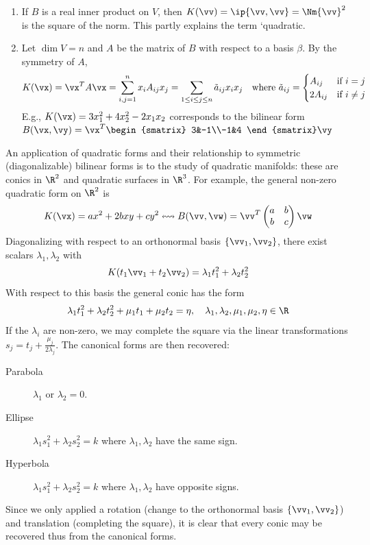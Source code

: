 \begin{examples}{}{}
\begin{enumerate}
  \item If $B$ is a real inner product on $V$, then $K(\vv)=\ip{\vv,\vv}=\Nm{\vv}^2$ is the square of the norm. This partly explains the term `quadratic.
  
  \item Let $\dim V=n$ and $A$ be the matrix of $B$ with respect to a basis $\beta$. By the symmetry of $A$,
  \[K(\vx)=\vx^TA\vx=\sum_{i,j=1}^nx_iA_{ij}x_j =\sum_{1\le i\le j\le n}\tilde a_{ij}x_ix_j
  \quad\text{where}\ \tilde a_{ij}=\begin{cases}
  A_{ij}&\text{if $i=j$}\\
  2A_{ij}&\text{if }i\neq j
  \end{cases}\]
  E.g., $K(\vx)=3x_1^2+4x_2^2-2x_1x_2$ corresponds to the bilinear form $B(\vx,\vy)=\vx^T\begin{smatrix}
  3&-1\\-1&4
  \end{smatrix}\vy$
\end{enumerate}
\end{examples}

An application of quadratic forms and their relationship to symmetric (diagonalizable) bilinear forms is to the study of quadratic manifolds: these are conics in $\R^2$ and quadratic surfaces in $\R^3$. For example, the general non-zero quadratic form on $\R^2$ is
\[K(\vx)=ax^2+2bxy+cy^2\leftrightsquigarrow B(\vv,\vw)=\vv^T\begin{pmatrix}
a&b\\b&c
\end{pmatrix}\vw\]
Diagonalizing with respect to an orthonormal basis $\{\vv_1,\vv_2\}$, there exist scalars $\lambda_1,\lambda_2$ with
\[K(t_1\vv_1+t_2\vv_2)=\lambda_1t_1^2+\lambda_2t_2^2\]
With respect to this basis the general conic has the form
\[\lambda_1t_1^2+\lambda_2t_2^2+\mu_1t_1+\mu_2t_2=\eta,\quad \lambda_1,\lambda_2,\mu_1,\mu_2,\eta\in\R\]
If the $\lambda_i$ are non-zero, we may complete the square via the linear transformations $s_j=t_j+\frac{\mu_j}{2\lambda_j}$. The canonical forms are then recovered:
\begin{description}
	\item[\normalfont Parabola] $\lambda_1$ or $\lambda_2=0$.
	\item[\normalfont Ellipse] $\lambda_1s_1^2+\lambda_2s_2^2=k$ where $\lambda_1,\lambda_2$ have the same sign.
	\item[\normalfont Hyperbola] $\lambda_1s_1^2+\lambda_2s_2^2=k$ where $\lambda_1,\lambda_2$ have opposite signs.
\end{description}
Since we only applied a rotation (change to the orthonormal basis $\{\vv_1,\vv_2\}$) and translation (completing the square), it is clear that every conic may be recovered thus from the canonical forms.


